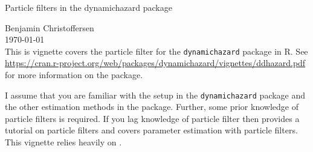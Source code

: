 \newcommand{\expec}[1]{\optor{\E}{#1}}
\newcommand{\expecC}[2]{\optorC{\E}{#1}{#2}}

\newcommand{\varp}[1]{\optor{\VAR}{#1}}
\newcommand{\varpC}[2]{\optorC{\VAR}{#1}{#2}}

\newcommand{\covp}[1]{\optor{\COV}{#1}}
\newcommand{\covpC}[2]{\optorC{\COV}{#1}{#2}}

\newcommand{\propAproxC}[2]{\optorC{\widetilde{p}}{#1}{#2}}

\newcommand{\dirac}[1]{\optor{\delta}{#1}}

\newcommand{\normal}[2]{\optor{\mathcal{N}}{#1,#2}}
\newcommand{\normalC}[3]{\optorC{\mathcal{N}}{#1}{#2,#3}}

\newcommand{\IDC}[2]{\optorC{q}{#1}{#2}}
\newcommand{\IDAproxC}[2]{\optorC{\widetilde{q}}{#1}{#2}}

\newcommand{\diag}[1]{\optor{\text{diag}}{#1}}

\newcommand{\KF}[3]{#1_{\left. #2 \right\vert #3}}
\newcommand{\KFSup}[4]{#1_{\left. #2 \right\vert #3}^{(#4)}}

\newcommand{\partic}[3]{#1_{#2}^{\Lparen{#3}}}
\newcommand{\particB}[3]{\widetilde{#1}_{#2}^{\Lparen{#3}}}
\newcommand{\particS}[3]{\widehat{#1}_{#2}^{\Lparen{#3}}}

\newcommand{\bigO}[1]{\mathcal{O}\Lparen{#1}}

\newcommand*{\myTitle}{\begingroup 
\centering 
{\LARGE Particle filters in the dynamichazard package} \\[\baselineskip]
\scshape

Benjamin Christoffersen \\[\baselineskip]
\today \\[\baselineskip]
\vspace*{3\baselineskip}
\endgroup}


\myTitle
This is vignette covers the particle filter for the \verb|dynamichazard| package in R. See \url{https://cran.r-project.org/web/packages/dynamichazard/vignettes/ddhazard.pdf} for more information on the package.

I assume that you are familiar with the setup in the \verb|dynamichazard| package and the other estimation methods in the package. Further, some prior knowledge of particle filters is required.  If you lag knowledge of particle filter then \cite{doucet09} provides a tutorial on particle filters and \cite{kantas15} covers parameter estimation with particle filters. This vignette relies heavily on \cite{fearnhead10}.


